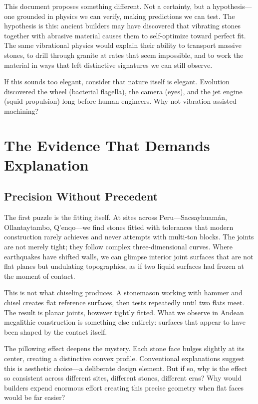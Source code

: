 \documentclass[11pt]{article}
\begin{document}
This document proposes something different. Not a certainty, but a hypothesis---one grounded in physics we can verify, making predictions we can test. The hypothesis is this: ancient builders may have discovered that vibrating stones together with abrasive material causes them to self-optimize toward perfect fit. The same vibrational physics would explain their ability to transport massive stones, to drill through granite at rates that seem impossible, and to work the material in ways that left distinctive signatures we can still observe.

If this sounds too elegant, consider that nature itself is elegant. Evolution discovered the wheel (bacterial flagella), the camera (eyes), and the jet engine (squid propulsion) long before human engineers. Why not vibration-assisted machining?

\section{The Evidence That Demands Explanation}

\subsection{Precision Without Precedent}

The first puzzle is the fitting itself. At sites across Peru---Sacsayhuamán, Ollantaytambo, Q'enqo---we find stones fitted with tolerances that modern construction rarely achieves and never attempts with multi-ton blocks. The joints are not merely tight; they follow complex three-dimensional curves. Where earthquakes have shifted walls, we can glimpse interior joint surfaces that are not flat planes but undulating topographies, as if two liquid surfaces had frozen at the moment of contact.

This is not what chiseling produces. A stonemason working with hammer and chisel creates flat reference surfaces, then tests repeatedly until two flats meet. The result is planar joints, however tightly fitted. What we observe in Andean megalithic construction is something else entirely: surfaces that appear to have been shaped by the contact itself.

The pillowing effect deepens the mystery. Each stone face bulges slightly at its center, creating a distinctive convex profile. Conventional explanations suggest this is aesthetic choice---a deliberate design element. But if so, why is the effect so consistent across different sites, different stones, different eras? Why would builders expend enormous effort creating this precise geometry when flat faces would be far easier?
\end{document}
